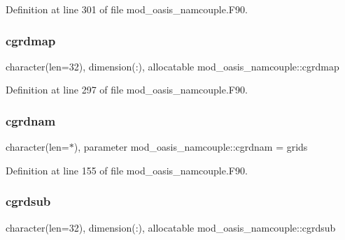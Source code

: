 Definition at line 301 of file mod\+\_\+oasis\+\_\+namcouple.\+F90.

\mbox{\label{namespacemod__oasis__namcouple_a6a86cf4b0f404b86ea40fee517ae41d2}} 
\subsubsection{\texorpdfstring{cgrdmap}{cgrdmap}}
{\footnotesize\ttfamily character(len=32), dimension(\+:), allocatable mod\+\_\+oasis\+\_\+namcouple\+::cgrdmap\hspace{0.3cm}{\ttfamily [private]}}



Definition at line 297 of file mod\+\_\+oasis\+\_\+namcouple.\+F90.

\mbox{\label{namespacemod__oasis__namcouple_a6550ad2692a6520d9d32776d63e6ed55}} 
\subsubsection{\texorpdfstring{cgrdnam}{cgrdnam}}
{\footnotesize\ttfamily character(len=$\ast$), parameter mod\+\_\+oasis\+\_\+namcouple\+::cgrdnam = \textquotesingle{}grids\textquotesingle{}\hspace{0.3cm}{\ttfamily [private]}}



Definition at line 155 of file mod\+\_\+oasis\+\_\+namcouple.\+F90.

\mbox{\label{namespacemod__oasis__namcouple_aeadda41d70a777c38f17d845dd429385}} 
\subsubsection{\texorpdfstring{cgrdsub}{cgrdsub}}
{\footnotesize\ttfamily character(len=32), dimension(\+:), allocatable mod\+\_\+oasis\+\_\+namcouple\+::cgrdsub\hspace{0.3cm}{\ttfamily [private]}}



